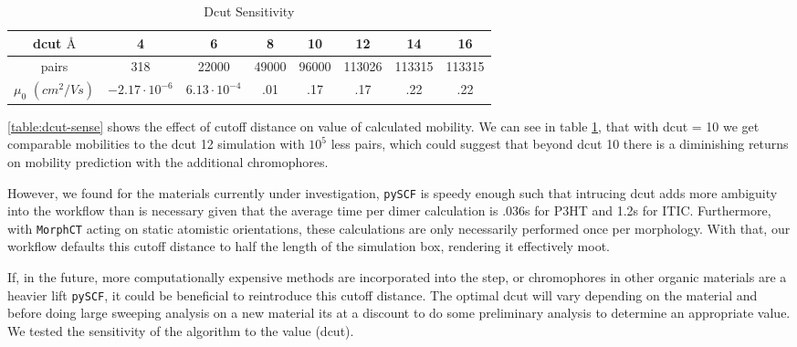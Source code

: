 \begin{table}
\caption{Dcut Sensitivity}
\centering %
\begin{tabular}{c c c c c c c c} %
\hline\hline %
    dcut $\text{\AA}$ & 4 & 6 & 8 & 10 & 12 & 14 & 16 \\ [0.5ex] %
\hline  %
pairs & 318 & 22000 & 49000 & 96000 & 113026 & 113315 & 113315 \\ [1ex]%
$\mu_{0}$ $(cm^{2}/Vs)$ & $-2.17 \cdot 10^{-6}$ & $6.13 \cdot 10^{-4}$ & .01 & .17 & .17 & .22 & .22 \\ [1ex] %
\hline %
\end{tabular}
\label{table:dcut-sense} %
\end{table}

\autoref{table:dcut-sense} shows the effect of cutoff distance on value of
calculated mobility.  
 We can see in table \ref{table:dcut-sense}, that with dcut = 10 we get comparable mobilities to the
dcut 12 simulation with $10^5$ less
pairs, which could suggest that beyond dcut 10 there is a diminishing returns on mobility prediction with the
additional chromophores. 

However, we found for the materials currently under investigation,
\texttt{pySCF} is speedy enough such that intrucing dcut adds more ambiguity
into the workflow than is necessary given that the average time per  dimer calculation is .036s for P3HT and
1.2s for ITIC. Furthermore, with \texttt{MorphCT} acting on static atomistic orientations, these calculations 
are only necessarily performed once per morphology. With that, our workflow defaults this cutoff distance to half
the length of the simulation box, rendering it effectively moot. 

If, in the future, more computationally expensive methods are incorporated into the  step, or chromophores in other
organic materials are a heavier lift \texttt{pySCF}, it could be beneficial to reintroduce this cutoff distance. The optimal dcut will vary depending on the material and before doing large sweeping analysis on a new
material its at a discount to do some preliminary analysis to determine an appropriate value. We tested the
sensitivity of the algorithm to the value (dcut). 

